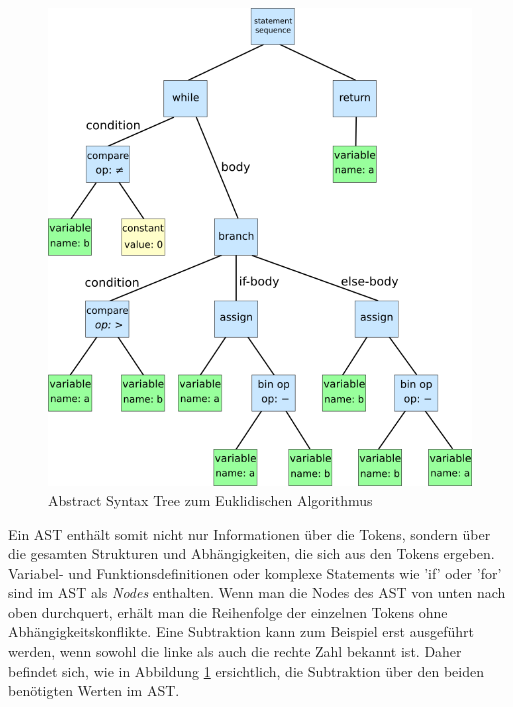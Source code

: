 \begin{figure}[H]
    \centering
    \includegraphics[scale=0.3]{resources/images/syntaxtree.svg.png}
    \caption[Abstract Syntax Tree (https://en.wikipedia.org/wiki/Abstract\_syntax\_tree, besucht am 5.8.2024)]{Abstract Syntax Tree zum Euklidischen Algorithmus}
    \label{fig:syntax-tree}
\end{figure}

Ein AST enthält somit nicht nur Informationen über die Tokens, sondern über die gesamten Strukturen und Abhängigkeiten, die sich aus den Tokens ergeben. Variabel- und Funktionsdefinitionen oder komplexe Statements wie 'if' oder 'for'
sind im AST als \textit{Nodes} enthalten. Wenn man die Nodes des AST von unten nach oben durchquert, erhält man die Reihenfolge der einzelnen Tokens ohne Abhängigkeitskonflikte.
Eine Subtraktion kann zum Beispiel erst ausgeführt werden, wenn sowohl die linke als auch die rechte Zahl bekannt ist.
Daher befindet sich, wie in Abbildung \ref{fig:syntax-tree} ersichtlich, die Subtraktion über den beiden benötigten Werten im AST.

